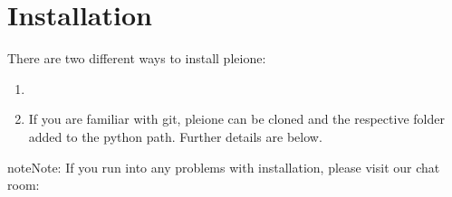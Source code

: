 \documentclass[letterpaper,10pt,english]{sphinxmanual}
\begin{document}
\chapter{Installation}
\label{\detokenize{Installation:installation}}\label{\detokenize{Installation::doc}}
There are two different ways to install pleione:
\begin{enumerate}
\def\theenumi{\arabic{enumi}}
\def\labelenumi{\theenumi .}
\makeatletter\def\p@enumii{\p@enumi \theenumi .}\makeatother
\item {} 


\item {} 
 If you are familiar with git, pleione can
be cloned and the respective folder added to the python path. Further details
are below.

\end{enumerate}

\begin{sphinxadmonition}{note}{Note:}
If you run into any problems with installation, please visit our chat room:
\end{sphinxadmonition}
\end{document}
